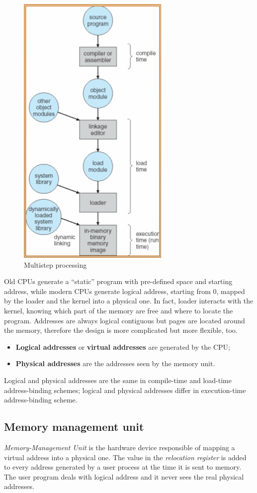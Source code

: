 \begin{figure}[hbtp]
\centering
\includegraphics[scale=0.4]{images/memory_management/multistep_processing.jpg}
\caption{Multistep processing}
\end{figure}

Old CPUs generate a ``static'' program with pre-defined space and starting address, while modern CPUs generate logical address, starting from 0, mapped by the loader and the kernel into a physical one. In fact, loader interacts with the kernel, knowing which part of the memory are free and where to locate the program.
Addresses are always logical contiguous but pages are located around the memory, therefore the design is more complicated but more flexible, too.
\begin{itemize}
\item \textbf{Logical addresses} or \textbf{virtual addresses} are generated by the CPU;
\item \textbf{Physical addresses} are the addresses seen by the memory unit.
\end{itemize}
Logical and physical addresses are the same in compile-time and load-time address-binding schemes; logical and physical addresses differ in execution-time address-binding scheme.

\subsection*{Memory management unit}
\emph{Memory-Management Unit} is the hardware device responsible of mapping a virtual address into a physical one. The value in the \emph{relocation register} is added to every address generated by a user process at the time it is sent to memory. The user program deals with logical address and it never sees the real physical addresses.

